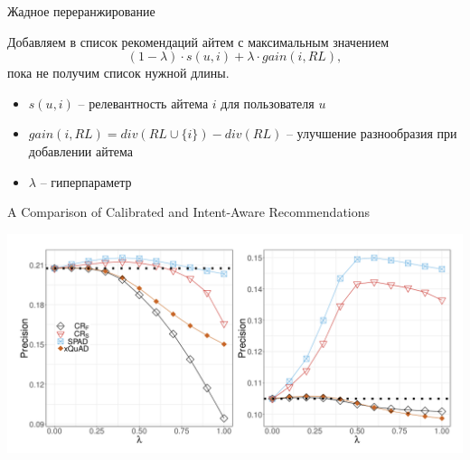 \documentclass[11pt,aspectratio=169]{beamer}
\begin{document}
\begin{frame}{Жадное переранжирование}

\begin{tcolorbox}[colback=info!5,colframe=info!80,title=]
Добавляем в список рекомендаций айтем с максимальным значением
\[
(1 - \lambda) \cdot s(u, i) + \lambda \cdot gain(i, RL),
\]
пока не получим список нужной длины.
\end{tcolorbox}

\vfill

\begin{itemize}
\item $s(u, i)$ -- релевантность айтема $i$ для пользователя $u$ 
\item $gain(i, RL) = div(RL \cup \{i\}) - div(RL)$ -- улучшение разнообразия при добавлении айтема
\item $\lambda$ -- гиперпараметр
\end{itemize}

\end{frame}

\begin{frame}{A Comparison of Calibrated and Intent-Aware Recommendations \cite{BRIDGE}}
\begin{center}
\includegraphics[scale=0.5]{images/spad.png}
\end{center}
\end{frame}
\end{document}
